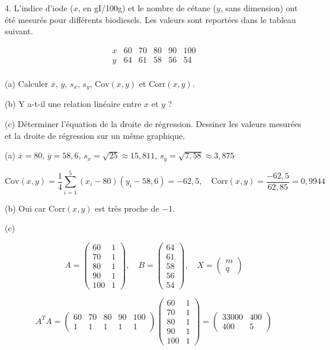 \documentclass{article}
\begin{document}
4. L'indice d'iode ($x$, en gI/100g) et le nombre de cétane ($y$, sans dimension) ont été mesurés pour différents biodiesels. Les valeurs sont reportées dans le tableau suivant.

\[
\begin{array}{c|cccccc}
x & 60 & 70 & 80 & 90 & 100 \\
y & 64 & 61 & 58 & 56 & 54 \\
\end{array}
\]

(a) Calculer $\overline{x}$, $\overline{y}$, $s_x$, $s_y$, $\mathrm{Cov}(x,y)$ et $\mathrm{Corr}(x,y)$.

(b) Y a-t-il une relation linéaire entre $x$ et $y$ ?

(c) Déterminer l'équation de la droite de régression. Dessiner les valeurs mesurées et la droite de régression sur un même graphique.

\vspace{0.5cm}

(a) \quad $\overline{x} = 80$, \quad $\overline{y} = 58,6$, \quad $s_x = \sqrt{25} \approx 15,811$, \quad $s_y = \sqrt{7,58} \approx 3,875$

\[
\mathrm{Cov}(x,y) = \frac{1}{4} \sum_{i=1}^5 (x_i - 80)(y_i - 58,6) = -62,5, \quad \mathrm{Corr}(x,y) = \frac{-62,5}{62,85} = 0,9944
\]

(b) Oui car $\mathrm{Corr}(x,y)$ est très proche de $-1$.

(c)

\[
A = \begin{pmatrix}
60 & 1 \\
70 & 1 \\
80 & 1 \\
90 & 1 \\
100 & 1
\end{pmatrix}, \quad
B = \begin{pmatrix}
64 \\
61 \\
58 \\
56 \\
54
\end{pmatrix}, \quad
X = \begin{pmatrix} m \\ q \end{pmatrix}
\]

\[
A^T A = \begin{pmatrix}
60 & 70 & 80 & 90 & 100 \\
1 & 1 & 1 & 1 & 1
\end{pmatrix}
\begin{pmatrix}
60 & 1 \\
70 & 1 \\
80 & 1 \\
90 & 1 \\
100 & 1
\end{pmatrix}
= \begin{pmatrix}
33000 & 400 \\
400 & 5
\end{pmatrix}
\]
\end{document}
